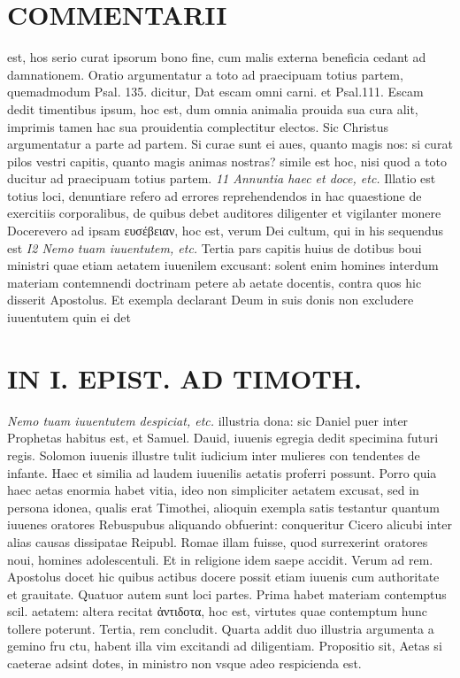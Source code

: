 \documentclass{article}
\begin{document}
\begin{pages}
\section*{COMMENTARII }
\marginpar{[ p.104 ]}\pstart est, hos serio curat ipsorum bono fine, cum malis externa beneficia cedant ad damnationem. Oratio argumentatur a toto ad praecipuam totius partem, quemadmodum Psal. 135. dicitur, Dat escam omni carni. et Psal.111. Escam dedit timentibus ipsum, hoc est, dum omnia animalia prouida sua cura alit, imprimis tamen hac sua prouidentia complectitur electos. Sic Christus argumentatur a parte ad partem. Si curae sunt ei aues, quanto magis nos: si curat pilos vestri capitis, quanto magis animas nostras? simile est hoc, nisi quod a toto ducitur ad praecipuam totius partem.  \pend
\textit{11 Annuntia haec et doce, etc. }\pstart Illatio est totius loci, denuntiare refero ad errores reprehendendos in hac quaestione de exercitiis corporalibus, de quibus debet auditores diligenter et vigilanter monere  \pend\pstart Docerevero ad ipsam ευσέβειαν, hoc est, verum Dei cultum, qui in his sequendus est  \pend
\textit{I2 Nemo tuam iuuentutem, etc. }\pstart Tertia pars capitis huius de dotibus boui ministri quae etiam aetatem iuuenilem excusant: solent enim homines interdum materiam contemnendi doctrinam petere ab aetate docentis, contra quos hic disserit Apostolus. Et exempla declarant Deum in suis donis non excludere iuuentutem quin ei det  \pend
\section*{IN I. EPIST. AD TIMOTH. }
\marginpar{[ p.105 ]}
\textit{Nemo tuam iuuentutem despiciat, etc. }\pstart illustria dona: sic Daniel puer inter Prophetas habitus est, et Samuel. Dauid, iuuenis egregia dedit specimina futuri regis. Solomon iuuenis illustre tulit iudicium inter mulieres con tendentes de infante. Haec et similia ad laudem iuuenilis aetatis proferri possunt. Porro quia haec aetas enormia habet vitia, ideo non simpliciter aetatem excusat, sed in persona idonea, qualis erat Timothei, alioquin exempla satis testantur quantum iuuenes oratores Rebuspubus aliquando obfuerint: conqueritur Cicero alicubi inter alias causas dissipatae Reipubl. Romae illam fuisse, quod surrexerint oratores noui, homines adolescentuli. Et in religione idem saepe accidit.  \pend\pstart Verum ad rem. Apostolus docet hic quibus actibus docere possit etiam iuuenis cum authoritate et grauitate. Quatuor autem sunt loci partes. Prima habet materiam contemptus scil. aetatem: altera recitat ἀντιδοτα, hoc est, virtutes quae contemptum hunc tollere poterunt. Tertia, rem concludit. Quarta addit duo illustria argumenta a gemino fru ctu, habent illa vim excitandi ad diligentiam.  \pend\pstart Propositio sit, Aetas si caeterae adsint dotes, in ministro non vsque adeo respicienda est.  \pend

\end{pages}
\end{document}
